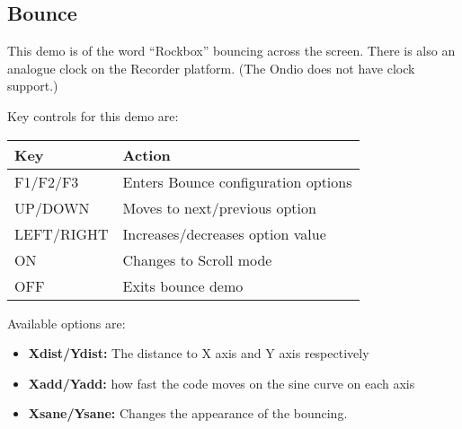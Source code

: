 \subsection{Bounce}

This demo is of the word ``Rockbox'' bouncing across the screen.  There
is also an analogue clock on the Recorder platform.  (The Ondio does
not have clock support.)

Key controls for this demo are:

\begin{table}[h!]
\begin{center}
\begin{tabular}{@{}ll@{}}\toprule
\textbf{Key} & \textbf{Action} \\\midrule
F1/F2/F3 & Enters Bounce configuration options \\
UP/DOWN & Moves to next/previous option \\
LEFT/RIGHT & Increases/decreases option value \\
ON & Changes to Scroll mode \\
OFF & Exits bounce demo\\\bottomrule
\end{tabular}
\end{center}
\end{table}
Available options are:

\begin{itemize}
\item \textbf{Xdist/Ydist:} The distance to X axis and Y axis
respectively
\item \textbf{Xadd/Yadd:} how fast the code moves on the sine curve on
each axis
\item \textbf{Xsane/Ysane:} Changes the appearance of the bouncing.
\end{itemize}